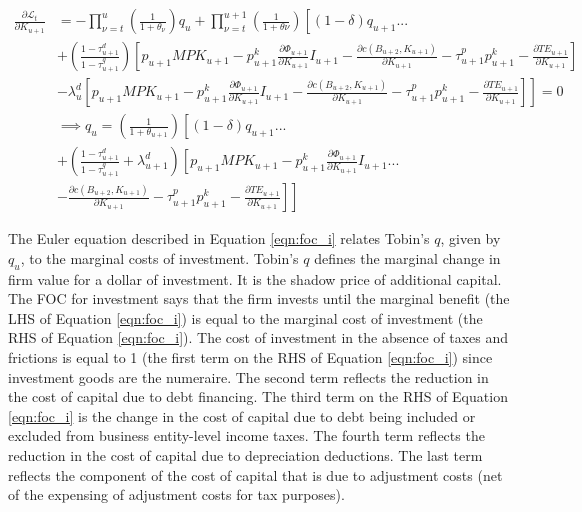 \begin{equation}
\label{eqn:foc_k}
\begin{split}
 \frac{\partial \mathcal{L}_{t}}{\partial K_{u+1}}  &=  - \prod_{\nu=t}^{u}\left(\frac{1}{1+\theta_{\nu}}\right)q_{u}  + \prod_{\nu=t}^{u+1}\left(\frac{1}{1+\theta{\nu}}\right)\left[(1-
\delta)q_{u+1} ... \right. \\
&\left. +    \left(\frac{1-\tau^{d}_{u+1}}{1-\tau^{g}_{u+1}}\right)\left[p_{u+1}MPK_{u+1} - p^{k}_{u+1}\frac{\partial \Phi_{u+1}}{\partial K_{u+1}}I_{u+1} - \frac{\partial c(B_{u+2},K_{u+1})}{\partial K_{u+1}}-\tau^{p}_{u+1}p^{k}_{u+1}-\frac{\partial TE_{u+1}}{\partial K_{u+1}} \right] \right. \\
& \left. - \lambda^{d}_{u}\left[p_{u+1}MPK_{u+1} - p^{k}_{u+1}\frac{\partial \Phi_{u+1}}{\partial K_{u+1}}I_{u+1} - \frac{\partial c(B_{u+2},K_{u+1})}{\partial K_{u+1}}-\tau^{p}_{u+1}p^{k}_{u+1}-\frac{\partial TE_{u+1}}{\partial K_{u+1}} \right] \right] = 0 \\
&\implies q_{u} = \left(\frac{1}{1+\theta_{u+1}}\right)\left[(1-\delta)q_{u+1} ... \right. \\
& \left. +  \left(\frac{1-\tau^{d}_{u+1}}{1-\tau^{g}_{u+1}} + \lambda^{d}_{u+1} \right)\left[p_{u+1}MPK_{u+1}- p^{k}_{u+1}\frac{\partial \Phi_{u+1}}{\partial K_{u+1}}I_{u+1}  ... \right.\right. \\
& \left.\left.- \frac{\partial c(B_{u+2},K_{u+1})}{\partial K_{u+1}}-\tau^{p}_{u+1}p^{k}_{u+1}-\frac{\partial TE_{u+1}}{\partial K_{u+1}} \right] \right]
\end{split}
\end{equation}

\noindent\noindent The Euler equation described in Equation \ref{eqn:foc_i} relates Tobin's $q$, given by $q_{u}$, to the marginal costs of investment.  Tobin's $q$ defines the marginal change in firm value for a dollar of investment. It is the shadow price of additional capital.  The FOC for investment says that the firm invests until the marginal benefit (the LHS of Equation \ref{eqn:foc_i}) is equal to the marginal cost of investment (the RHS of Equation \ref{eqn:foc_i}).  The cost of investment in the absence of taxes and frictions is equal to 1 (the first term on the RHS of Equation \ref{eqn:foc_i}) since investment goods are the numeraire.  The second term reflects the reduction in the cost of capital due to debt financing.  The third term on the RHS of Equation \ref{eqn:foc_i} is the change in the cost of capital due to debt being included or excluded from business entity-level income taxes.  The fourth term reflects the reduction in the cost of capital due to depreciation deductions.  The last term reflects the component of the cost of capital that is due to adjustment costs (net of the expensing of adjustment costs for tax purposes).

